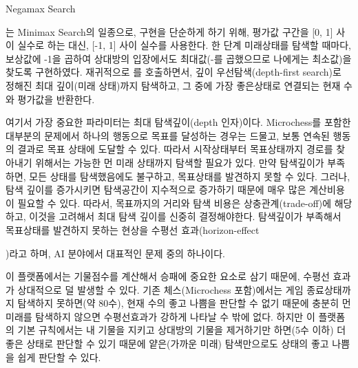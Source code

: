 \documentclass[letterpaper,10pt,english]{sphinxmanual}
\begin{document}
\begin{sphinxVerbatim}[commandchars=\\\{\},numbers=left,firstnumber=1,stepnumber=1]
          
          

\end{sphinxVerbatim}

Negamax Search %
\begin{footnote}[2]\sphinxAtStartFootnote
{}
%
\end{footnote} 는 Minimax Search의 일종으로, 구현을 단순하게 하기 위해, 평가값 구간을 {[}0, 1{]} 사이 실수로 하는 대신,
{[}-1, 1{]} 사이 실수를 사용한다. 한 단계 미래상태를 탐색할 때마다, 보상값에 -1을 곱하여
상대방의 입장에서도 최대값(-를 곱했으므로 나에게는 최소값)을 찾도록 구현하였다.
재귀적으로 {\hyperref[\detokenize{03-basic_ai_examples:negamax-search-code}]{}} 를 호출하면서, 깊이 우선탐색(depth-first search)로 정해진 최대 깊이(미래 상태)까지 탐색하고,
그 중에 가장 좋은상태로 연결되는 현재 수와 평가값을 반환한다.

여기서 가장 중요한 파라미터는 최대 탐색깊이(depth 인자)이다.
Microchess를 포함한 대부분의 문제에서 하나의 행동으로 목표를 달성하는 경우는 드물고,
보통 연속된 행동의 결과로 목표 상태에 도달할 수 있다.
따라서 시작상태부터 목표상태까지 경로를 찾아내기 위해서는 가능한 먼 미래 상태까지 탐색할 필요가 있다.
만약 탐색깊이가 부족하면, 모든 상태를 탐색했음에도 불구하고, 목표상태를 발견하지 못할 수 있다.
그러나, 탐색 깊이를 증가시키면 탐색공간이 지수적으로 증가하기 때문에 매우 많은
계산비용이 필요할 수 있다. 따라서, 목표까지의 거리와 탐색 비용은 상충관계(trade-off)에 해당하고,
이것을 고려해서 최대 탐색 깊이를 신중히 결정해야한다. 탐색깊이가 부족해서 목표상태를 발견하지 못하는 현상을
수평선 효과(horizon-effect %
\begin{footnote}[3]\sphinxAtStartFootnote
{}
%
\end{footnote} )라고 하며, AI 분야에서 대표적인 문제 중의 하나이다.

이 플랫폼에서는 기물점수를 계산해서 승패에 중요한 요소로 삼기 때문에, 수평선 효과가 상대적으로 덜 발생할 수 있다.
기존 체스(Microchess 포함)에서는 게임 종료상태까지 탐색하지 못하면(약 80수), 현재 수의 좋고 나쁨을 판단할 수 없기 때문에
충분히 먼 미래를 탐색하지 않으면 수평선효과가 강하게 나타날 수 밖에 없다. 하지만 이 플랫폼의 기본 규칙에서는
내 기물을 지키고 상대방의 기물을 제거하기만 하면(5수 이하) 더 좋은 상태로 판단할 수 있기 때문에 얕은(가까운 미래) 탐색만으로도
상태의 좋고 나쁨을 쉽게 판단할 수 있다.
\end{document}

